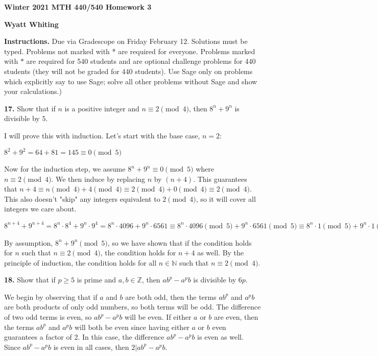 \documentclass[12pt]{amsart}
\def\ZZ{{\mathbb Z}}
\def\NN{{\mathbb N}}
\begin{document}
{\bf Winter 2021 MTH 440/540 Homework 3}

{\bf Wyatt Whiting}

\medskip

{\bf Instructions.}  Due via Gradescope on Friday February 12.  Solutions must be typed.  Problems not marked with * are required for everyone.  Problems marked with $*$ are required for 540 students and are optional challenge problems for 440 students  (they will not be graded for 440 students).  Use Sage only on problems which explicitly say to use Sage; solve all other problems without Sage and show your calculations.)

\medskip

{\bf 17.}  Show that if $n$ is a positive integer and $n\equiv2\pmod{4}$, then $8^n+9^n$ is divisible by $5$.

\medskip

I will prove this with induction. Let's start with the base case, $n=2$:

\smallskip

$8^2 + 9^2 = 64 + 81 = 145 \equiv 0\pmod{5}$

\smallskip

Now for the induction step, we assume $8^n + 9^n \equiv 0\pmod{5}$ where $n\equiv 2\pmod{4}$. We then induce by replacing $n$ by $(n+4)$. This guarantees that $n+4\equiv n\pmod{4} + 4\pmod{4}\equiv 2\pmod{4}+0\pmod{4}\equiv 2\pmod{4}$. This also doesn't "skip" any integers equivalent to $2\pmod{4}$, so it will cover all integers we care about.

\smallskip

$8^{n+4}+9^{n+4} = 8^n \cdot 8^4 + 9^n \cdot 9^4 = 8^n \cdot 4096 + 9^n\cdot 6561\equiv 8^n \cdot 4096\pmod{5} + 9^n\cdot 6561\pmod{5}\equiv 8^n\cdot 1\pmod{5} + 9^n\cdot 1\pmod{5} \equiv 1\cdot(8^n + 9^n)\pmod{5} \equiv 8^n + 9^n \pmod{5}$

\smallskip

By assumption, $8^n + 9^n \pmod{5}$, so we have shown that if the condition holds for $n$ such that $n\equiv 2\pmod{4}$, the condition holds for $n+4$ as well. By the principle of induction, the condition holds for all $n\in\NN$ such that $n\equiv 2\pmod{4}$.

\medskip

{\bf 18.}  Show that if $p\geq5$ is prime and $a,b\in\ZZ$, then $ab^p-a^pb$ is divisible by $6p$.

\medskip

We begin by observing that if $a$ and $b$ are both odd, then the terms $ab^p$ and $a^pb$ are both products of only odd numbers, so both terms will be odd. The difference of two odd terms is even, so $ab^p-a^pb$ will be even. If either $a$ or $b$ are even, then the terms $ab^p$ and $a^pb$ will both be even since having either $a$ or $b$ even guarantees a factor of 2. In this case, the difference $ab^p-a^pb$ is even as well. Since $ab^p-a^pb$ is even in all cases, then $2 | ab^p-a^pb$.
\end{document}
